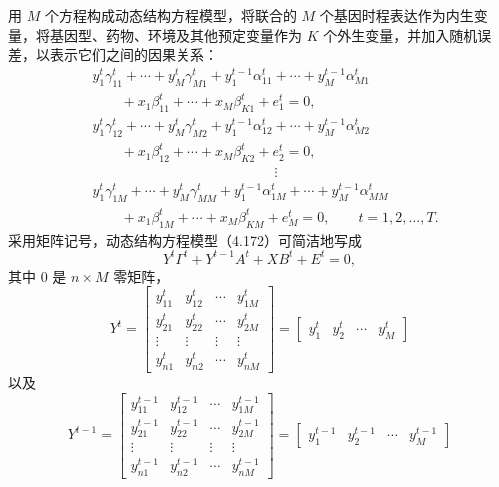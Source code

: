 用 $M$ 个方程构成动态结构方程模型，将联合的 $M$ 个基因时程表达作为内生变量，将基因型、药物、环境及其他预定变量作为 $K$ 个外生变量，并加入随机误差，以表示它们之间的因果关系：
\begin{equation}
\begin{aligned}
&y_1^t\gamma_{11}^t+\cdots+y_M^t\gamma_{M1}^t
 +y_1^{t-1}\alpha_{11}^t+\cdots+y_M^{t-1}\alpha_{M1}^t\\
&\qquad+x_1\beta_{11}^t+\cdots+x_M\beta_{K1}^t+e_1^t=0,\\
&y_1^t\gamma_{12}^t+\cdots+y_M^t\gamma_{M2}^t
 +y_1^{t-1}\alpha_{12}^t+\cdots+y_M^{t-1}\alpha_{M2}^t\\
&\qquad+x_1\beta_{12}^t+\cdots+x_M\beta_{K2}^t+e_2^t=0,\\
&\hspace{13em}\vdots\\
&y_1^t\gamma_{1M}^t+\cdots+y_M^t\gamma_{MM}^t
 +y_1^{t-1}\alpha_{1M}^t+\cdots+y_M^{t-1}\alpha_{MM}^t\\
&\qquad+x_1\beta_{1M}^t+\cdots+x_M\beta_{KM}^t+e_M^t=0,
\qquad t=1,2,\ldots,T.
\end{aligned}\tag{4.172}
\end{equation}
采用矩阵记号，动态结构方程模型（4.172）可简洁地写成
\begin{equation}
Y^t\Gamma^t+Y^{t-1}A^t+XB^t+E^t=0,\tag{4.173}
\end{equation}
其中 $0$ 是 $n\times M$ 零矩阵，
\begin{equation}
Y^t=\begin{bmatrix}
y_{11}^t&y_{12}^t&\cdots&y_{1M}^t\\
y_{21}^t&y_{22}^t&\cdots&y_{2M}^t\\
\vdots&\vdots&\vdots&\vdots\\
y_{n1}^t&y_{n2}^t&\cdots&y_{nM}^t
\end{bmatrix}
=\begin{bmatrix}y_1^t&y_2^t&\cdots&y_M^t\end{bmatrix}\tag{4.174}
\end{equation}
以及
\begin{equation}
Y^{t-1}=\begin{bmatrix}
y_{11}^{t-1}&y_{12}^{t-1}&\cdots&y_{1M}^{t-1}\\
y_{21}^{t-1}&y_{22}^{t-1}&\cdots&y_{2M}^{t-1}\\
\vdots&\vdots&\vdots&\vdots\\
y_{n1}^{t-1}&y_{n2}^{t-1}&\cdots&y_{nM}^{t-1}
\end{bmatrix}
=\begin{bmatrix}y_1^{t-1}&y_2^{t-1}&\cdots&y_M^{t-1}\end{bmatrix}\tag{4.175}
\end{equation}
